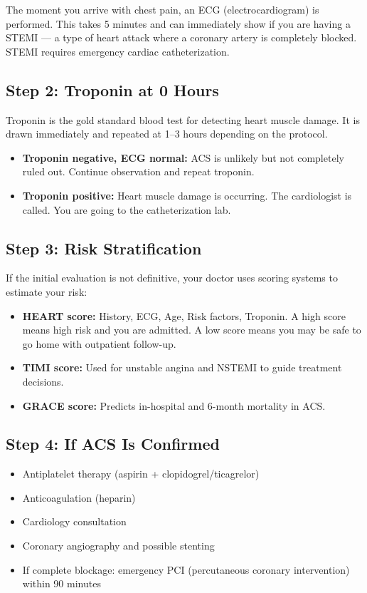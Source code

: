 The moment you arrive with chest pain, an ECG (electrocardiogram) is performed. This takes 5 minutes and can immediately show if you are having a STEMI --- a type of heart attack where a coronary artery is completely blocked. STEMI requires emergency cardiac catheterization.

\subsection{Step 2: Troponin at 0 Hours}

Troponin is the gold standard blood test for detecting heart muscle damage. It is drawn immediately and repeated at 1--3 hours depending on the protocol.

\begin{itemize}
    \item \textbf{Troponin negative, ECG normal:} ACS is unlikely but not completely ruled out. Continue observation and repeat troponin.
    \item \textbf{Troponin positive:} Heart muscle damage is occurring. The cardiologist is called. You are going to the catheterization lab.
\end{itemize}

\subsection{Step 3: Risk Stratification}

If the initial evaluation is not definitive, your doctor uses scoring systems to estimate your risk:

\begin{itemize}
    \item \textbf{HEART score:} History, ECG, Age, Risk factors, Troponin. A high score means high risk and you are admitted. A low score means you may be safe to go home with outpatient follow-up.
    \item \textbf{TIMI score:} Used for unstable angina and NSTEMI to guide treatment decisions.
    \item \textbf{GRACE score:} Predicts in-hospital and 6-month mortality in ACS.
\end{itemize}

\subsection{Step 4: If ACS Is Confirmed}

\begin{itemize}
    \item Antiplatelet therapy (aspirin + clopidogrel/ticagrelor)
    \item Anticoagulation (heparin)
    \item Cardiology consultation
    \item Coronary angiography and possible stenting
    \item If complete blockage: emergency PCI (percutaneous coronary intervention) within 90 minutes
\end{itemize}

